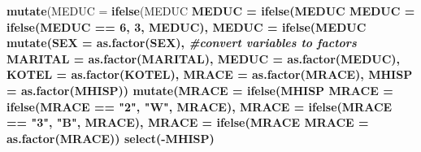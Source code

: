 \documentclass[
  12pt,
]{article}
\newenvironment{Shaded}{\begin{snugshade}}{\end{snugshade}}
\newcommand{\CommentTok}[1]{\textcolor[rgb]{0.56,0.35,0.01}{\textit{#1}}}
\newcommand{\DataTypeTok}[1]{\textcolor[rgb]{0.13,0.29,0.53}{#1}}
\newcommand{\DecValTok}[1]{\textcolor[rgb]{0.00,0.00,0.81}{#1}}
\newcommand{\KeywordTok}[1]{\textcolor[rgb]{0.13,0.29,0.53}{\textbf{#1}}}
\newcommand{\NormalTok}[1]{#1}
\newcommand{\OperatorTok}[1]{\textcolor[rgb]{0.81,0.36,0.00}{\textbf{#1}}}
\newcommand{\StringTok}[1]{\textcolor[rgb]{0.31,0.60,0.02}{#1}}
\begin{document}
\begin{Shaded}
\begin{Highlighting}[]
{{{{{{{{{{{{{\StringTok{  }\KeywordTok{mutate}\NormalTok{(}\DataTypeTok{MEDUC =} \KeywordTok{ifelse}\NormalTok{(MEDUC }\OperatorTok{%
         \DataTypeTok{MEDUC =} \KeywordTok{ifelse}\NormalTok{(MEDUC }\OperatorTok{%
         \DataTypeTok{MEDUC =} \KeywordTok{ifelse}\NormalTok{(MEDUC }\OperatorTok{==}\StringTok{ }\DecValTok{6}\NormalTok{, }\DecValTok{3}\NormalTok{, MEDUC),}
         \DataTypeTok{MEDUC =} \KeywordTok{ifelse}\NormalTok{(MEDUC }\OperatorTok{%
\StringTok{  }\KeywordTok{mutate}\NormalTok{(}\DataTypeTok{SEX =} \KeywordTok{as.factor}\NormalTok{(SEX), }\CommentTok{#convert variables to factors}
         \DataTypeTok{MARITAL =} \KeywordTok{as.factor}\NormalTok{(MARITAL),}
         \DataTypeTok{MEDUC =} \KeywordTok{as.factor}\NormalTok{(MEDUC),}
         \DataTypeTok{KOTEL =} \KeywordTok{as.factor}\NormalTok{(KOTEL),}
         \DataTypeTok{MRACE =} \KeywordTok{as.factor}\NormalTok{(MRACE),}
         \DataTypeTok{MHISP =} \KeywordTok{as.factor}\NormalTok{(MHISP)) }\OperatorTok{%
\StringTok{  }\KeywordTok{mutate}\NormalTok{(}\DataTypeTok{MRACE =} \KeywordTok{ifelse}\NormalTok{(MHISP }\OperatorTok{%
         \DataTypeTok{MRACE =} \KeywordTok{ifelse}\NormalTok{(MRACE }\OperatorTok{==}\StringTok{ "2"}\NormalTok{, }\StringTok{"W"}\NormalTok{, MRACE),}
         \DataTypeTok{MRACE =} \KeywordTok{ifelse}\NormalTok{(MRACE }\OperatorTok{==}\StringTok{ "3"}\NormalTok{, }\StringTok{"B"}\NormalTok{, MRACE),}
         \DataTypeTok{MRACE =} \KeywordTok{ifelse}\NormalTok{(MRACE }\OperatorTok{%
         \DataTypeTok{MRACE =} \KeywordTok{as.factor}\NormalTok{(MRACE)) }\OperatorTok{%
\StringTok{  }\KeywordTok{select}\NormalTok{(}\OperatorTok{-}\NormalTok{MHISP) }\OperatorTok{%
}}}}}}}}}}}}}}}}}}}}}
\end{Highlighting}
\end{Shaded}
\end{document}
